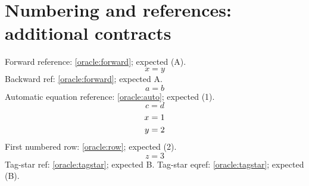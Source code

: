 \documentclass[11pt,a4paper]{article}
\begin{document}
\newpage
\section*{Numbering and references: additional contracts}
Forward reference: \eqref{oracle:forward}; expected (A).
\begin{equation}x=y\tag{A}\label{oracle:forward}\end{equation}
Backward ref: \ref{oracle:forward}; expected A.
\begin{equation}a=b\label{oracle:auto}\end{equation}
Automatic equation reference: \eqref{oracle:auto}; expected (1).
\begin{equation*}c=d\end{equation*}
\begin{align}
x&=1\label{oracle:row}\\
y&=2\notag
\end{align}
First numbered row: \eqref{oracle:row}; expected (2).
\[z=3\tag*{B}\label{oracle:tagstar}\]
Tag-star ref: \ref{oracle:tagstar}; expected B.
Tag-star eqref: \eqref{oracle:tagstar}; expected (B).
\end{document}

